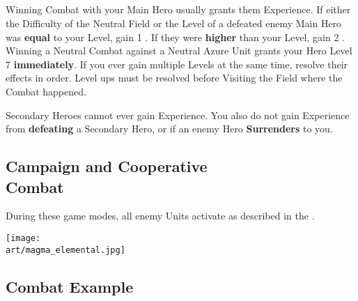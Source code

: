\begin{multicols*}{2}
\subsection*{}

Winning Combat with your Main Hero usually grants them Experience.
If either the Difficulty of the Neutral Field or the Level of a defeated enemy Main Hero was \textbf{equal} to your Level, gain 1 .
If they were \textbf{higher} than your Level, gain 2 .
Winning a Neutral Combat against a Neutral Azure  Unit grants your Hero Level 7 \textbf{immediately}.
If you ever gain multiple Levels at the same time, resolve their effects in order.
Level ups must be resolved before Visiting the Field where the Combat happened.\par
Secondary Heroes cannot ever gain Experience.
You also do not gain Experience from \textbf{defeating} a Secondary Hero, or if an enemy Hero \textbf{Surrenders} to you.

\subsection*{Campaign and Cooperative\\Combat}
During these game modes, all enemy Units activate as described in the .

\vspace*{\fill}
\begin{center}
  \texttt{[image: \\art/magma\_elemental.jpg]}
\end{center}

\end{multicols*}

\clearpage

\subsection*{Combat Example}

